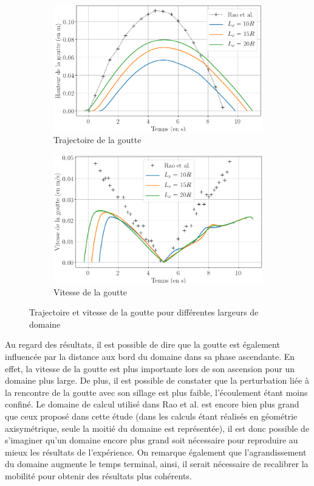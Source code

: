 \begin{figure}[H] 
	\centering
	\begin{subfigure}[H]{0.47\textwidth}
		\centering
		\includegraphics[width=\textwidth]{figure/impactDom_nospeed_position.png}
		\caption{Trajectoire de la goutte}
	\end{subfigure} 
	\begin{subfigure}[H]{0.47\textwidth}
		\centering
		\includegraphics[width=\textwidth]{figure/impactDom_nospeed_vitesse.png}
		\caption{Vitesse de la goutte}
	\end{subfigure}
	\caption{Trajectoire et vitesse de la goutte pour différentes largeurs de domaine}
	\label{fig:impactdom}
\end{figure}

Au regard des résultats, il est possible de dire que la goutte est également influencée par la distance aux bord du domaine dans sa phase ascendante. En effet, la vitesse de la goutte est plus importante lors de son ascension pour un domaine plus large. De plus, il est possible de constater que la perturbation liée à la rencontre de la goutte avec son sillage est plus faible, l'écoulement étant moins confiné. Le domaine de calcul utilisé dans Rao et al. \cite{rao_influence_2015} est encore bien plus grand que ceux proposé dans cette étude (dans \cite{rao_influence_2015} les calculs étant réalisés en géométrie axisymétrique, seule la moitié du domaine est représentée), il est donc possible de s'imaginer qu'un domaine encore plus grand soit nécessaire pour reproduire au mieux les résultats de l'expérience. On remarque également que l'agrandissement du domaine augmente le temps terminal, ainsi, il serait nécessaire de recalibrer la mobilité pour obtenir des résultats plus cohérents.

